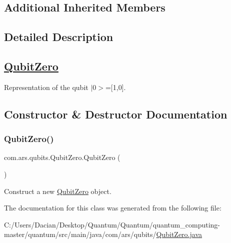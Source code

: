 \subsection*{Additional Inherited Members}


\subsection{Detailed Description}
\subsection*{\hyperlink{classcom_1_1ars_1_1qubits_1_1_qubit_zero}{Qubit\+Zero}}

Representation of the qubit $\vert$0$>$=\mbox{[}1,0\mbox{]}. 

\subsection{Constructor \& Destructor Documentation}
\hypertarget{classcom_1_1ars_1_1qubits_1_1_qubit_zero_a5844c1d4ff5a450e411f8e570b98b4af}{}\label{classcom_1_1ars_1_1qubits_1_1_qubit_zero_a5844c1d4ff5a450e411f8e570b98b4af} 
\subsubsection{\texorpdfstring{Qubit\+Zero()}{QubitZero()}}
{\footnotesize\ttfamily com.\+ars.\+qubits.\+Qubit\+Zero.\+Qubit\+Zero (\begin{DoxyParamCaption}{ }\end{DoxyParamCaption})}

Construct a new {\ttfamily  \hyperlink{classcom_1_1ars_1_1qubits_1_1_qubit_zero}{Qubit\+Zero}} object. 

The documentation for this class was generated from the following file\+:\begin{DoxyCompactItemize}
\item 
C\+:/\+Users/\+Dacian/\+Desktop/\+Quantum/\+Quantum/quantum\+\_\+computing-\/master/quantum/src/main/java/com/ars/qubits/\hyperlink{_qubit_zero_8java}{Qubit\+Zero.\+java}\end{DoxyCompactItemize}
